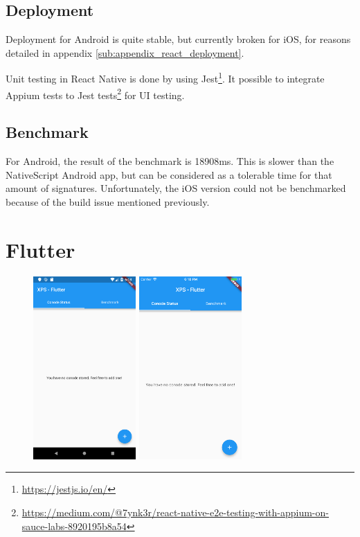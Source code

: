 \documentclass[11pt, a4paper, twoside, openright]{article} %
\begin{document}
{\subsection{Deployment}
Deployment for Android is quite stable, but currently broken for iOS, for reasons detailed in appendix \ref{sub:appendix_react_deployment}.

Unit testing in React Native is done by using Jest\footnote{\url{https://jestjs.io/en/}}. It possible to integrate Appium tests to Jest tests\footnote{\url{https://medium.com/@7ynk3r/react-native-e2e-testing-with-appium-on-sauce-labs-8920195b8a54}} for UI testing.
\subsection{Benchmark}
\label{sub:react_benchmark}
For Android, the result of the benchmark is 18908ms. This is slower than the NativeScript Android app, but can be considered as a tolerable time for that amount of signatures. Unfortunately, the iOS version could not be benchmarked because of the build issue mentioned previously.

\newpage
\section{Flutter}

\begin{figure}[!htb]
	\centering
	\includegraphics[width=0.35\textwidth]{img/Flutter_layout_android.png}
	\includegraphics[width=0.35\textwidth]{img/Flutter_layout_ios.png}
	

\end{figure}}
\end{document}
